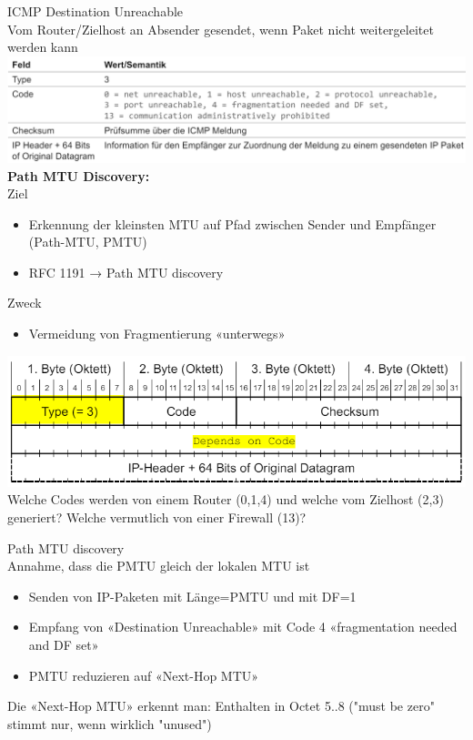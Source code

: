 \begin{definition}{ICMP Destination Unreachable}\\
    Vom Router/Zielhost an Absender gesendet, wenn Paket nicht weitergeleitet werden kann\\
        \includegraphics[width=1\linewidth]{images/destination_unreachable.png}\\
    \textbf{Path MTU Discovery:}\\
    Ziel
    \begin{itemize}
        \item Erkennung der kleinsten MTU auf Pfad zwischen Sender und Empfänger (Path-MTU, PMTU)
        \item RFC 1191 → Path MTU discovery
    \end{itemize}
    Zweck
    \begin{itemize}
        \item Vermeidung von Fragmentierung «unterwegs»
    \end{itemize}
\end{definition}

\begin{example}
        \includegraphics[width=0.75\linewidth]{images/dest_unreachable_ex1.png}\\
    Welche Codes werden von einem Router (0,1,4) und welche vom Zielhost (2,3) generiert?
    Welche vermutlich von einer Firewall (13)?
\end{example}

\begin{KR}{Path MTU discovery}\\
    Annahme, dass die PMTU gleich der lokalen MTU ist
    \begin{itemize}
        \item Senden von IP-Paketen mit Länge=PMTU und mit DF=1
        \item Empfang von «Destination Unreachable» mit Code 4 «fragmentation needed and DF set»
        \item PMTU reduzieren auf «Next-Hop MTU»
    \end{itemize}
    Die «Next-Hop MTU» erkennt man: Enthalten in Octet 5..8 ("must be zero" stimmt nur, wenn wirklich "unused")
\end{KR}


